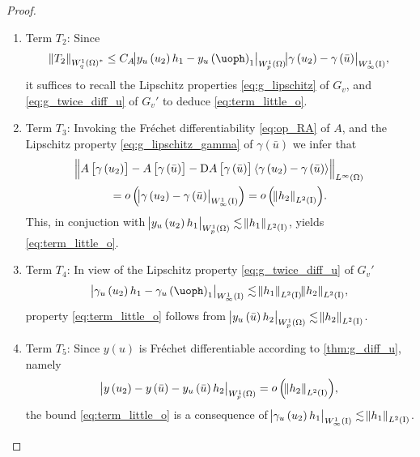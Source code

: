 \documentclass[final]{siamltex}
\begin{document}
\begin{proof}
\begin{enumerate}[$\bullet$]
	\item Term $T_2$: Since
	 	\[
		 	{\norm{{T_2}}_{{{W^{{1}}_{{q}}\del{{\Omega}}}}^*}} 
				\leq C_A{\abs{{y_u\del{u_2}h_1 - y_u\del\uoph_1}}_{{W^{{1}}_{{p}}\del{{\Omega}}}}}{\abs{{\gamma\del{u_2}-\gamma\del{\bar{u}}}}_{{W^{{1}}_{{\infty}}\del{{\text{\rm I}}}}}},
		\]
	it suffices to recall the Lipschitz properties \eqref{eq:g_lipschitz} of $G_v$, and \eqref{eq:g_twice_diff_u} of $G_v'$ to deduce \eqref{eq:term_little_o}.
	
	\item Term $T_3$: Invoking the Fr\'echet differentiability \eqref{eq:op_RA} of $A$,
	and the Lipschitz property \eqref{eq:g_lipschitz_gamma} of $\gamma({\bar{u}})$ we infer that
		\begin{multline*}
            		{\norm{{A\sbr{\gamma\del{u_2}} - A\sbr{\gamma\del{\bar{u}}} - \Dif A\sbr{\gamma\del{\bar{u}}}{\langle {\gamma\del{u_2} - \gamma\del{\bar{u}}} \rangle}}}_{{L^\infty\del{{\Omega}}}}}  \\                      		= {\mathop{o}\del{{{{\abs{{\gamma\del{u_2} - \gamma\del{\bar{u}}}}_{{W^{{1}}_{{\infty}}\del{{\text{\rm I}}}}}}}}}} = {\mathop{o}\del{{{{\norm{{h_2}}_{{L^2\del{{{\text{\rm I}}}}}}}}}}}.
		\end{multline*}
		This, in conjuction with ${\abs{{y_u\del{u_2} h_1}}_{{W^{{1}}_{{p}}\del{{\Omega}}}}} \lesssim{\norm{{h_1}}_{{L^2\del{{{\text{\rm I}}}}}}}$, yields \eqref{eq:term_little_o}.
	
	\item Term $T_4$: In view of the Lipschitz property \eqref{eq:g_twice_diff_u} of $G_v'$ 
		\[
			{\abs{{\gamma_u\del{u_2} h_1 - \gamma_u\del\uoph_1}}_{{W^{{1}}_{{\infty}}\del{{\text{\rm I}}}}}}
				\lesssim {\norm{{h_1}}_{{L^2\del{{{\text{\rm I}}}}}}}{\norm{{h_2}}_{{L^2\del{{{\text{\rm I}}}}}}},
		\]
	property \eqref{eq:term_little_o} follows from ${\abs{{y_u\del{\bar{u}} h_2}}_{{W^{{1}}_{{p}}\del{{\Omega}}}}} \lesssim {\norm{{h_2}}_{{L^2\del{{{\text{\rm I}}}}}}}$.

	\item Term $T_5$: Since $y(u)$ is Fr\'echet differentiable according to \autoref{thm:g_diff_u}, namely 
		\[
	        {\abs{{y\del{u_2} - y\del{\bar{u}} - y_u\del{\bar{u}} h_2}}_{{W^{{1}}_{{p}}\del{{\Omega}}}}} 
	      		= {\mathop{o}\del{{{{\norm{{h_2}}_{{L^2\del{{{\text{\rm I}}}}}}}}}}} ,
		\]
	the bound \eqref{eq:term_little_o} is a consequence of ${\abs{{\gamma_u\del{u_2} h_1}}_{{W^{{1}}_{{\infty}}\del{{\text{\rm I}}}}}} \lesssim {\norm{{h_1}}_{{L^2\del{{{\text{\rm I}}}}}}}$.
	

\end{enumerate}
\end{proof}
\end{document}
